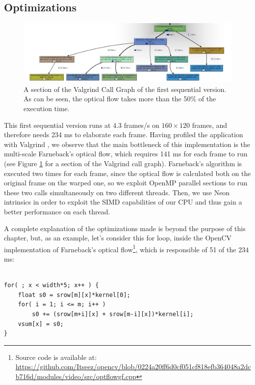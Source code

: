 \subsection{Optimizations}
\begin{figure}[t!]
\centering
\includegraphics[width=1.5\linewidth,angle=90]{Figures/grafico_prestazioni.jpg}
\caption{A section of the Valgrind Call Graph of the first sequential version. As can be seen, the optical flow takes more than the 50\% of the execution time.}
\label{valgrind}
\end{figure}

This first sequential version runs at 4.3 frames/s on $160\times 120$ frames, and therefore needs 234 ms to elaborate each frame. Having profiled the application with Valgrind \cite{nethercote2007valgrind}, we observe that the main bottleneck of this implementation is the multi-scale Farneback's optical flow, which requires 141 ms for each frame to run (see Figure \ref{valgrind} for a section of the Valgrind call graph). Farneback's algorithm is executed two times for each frame, since the optical flow is calculated both on the original frame on the warped one, so we exploit OpenMP parallel sections to run these two calls simultaneously on two different threads. Then, we use Neon intrinsics in order to exploit the SIMD capabilities of our CPU and thus gain a better performance on each thread.

A complete explanation of the optimizations made is beyond the purpose of this chapter, but, as an example, let's consider this for loop, inside the OpenCV implementation of Farneback's optical flow\footnote{Source code is available at: \url{https://github.com/Itseez/opencv/blob/0224a20ff6d0cf051cf818efb364048a2dcb716d/modules/video/src/optflowgf.cpp}}, which is responsible of 51 of the 234 ms:
\begin{lstlisting}[frame=single]  % Start your code-block

for( ; x < width*5; x++ ) {
	float s0 = srow[m][x]*kernel[0];
	for( i = 1; i <= m; i++ )
		s0 += (srow[m+i][x] + srow[m-i][x])*kernel[i];
	vsum[x] = s0;
}
\end{lstlisting}

